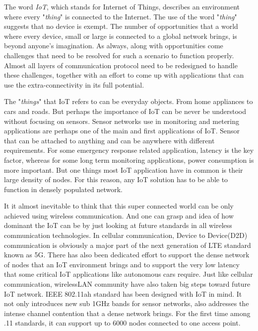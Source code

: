 \label{chapter:introduction}

The word \textit{IoT}, which stands for Internet of Things, describes an environment where every "\textit{thing}" is connected to the Internet. The use of the word "\textit{thing}" suggests that no device is exempt. The number of opportunities that a world where every device, small or large is connected to a global network brings, is beyond anyone's imagination. As always, along with opportunities come challenges that need to be resolved for such a scenario to function properly. Almost all layers of communication protocol need to be redesigned to handle these challenges, together with an effort to come up with applications that can use the extra-connectivity in its full potential.

The "\textit{things}" that IoT refers to can be everyday objects. From home appliances to cars and roads. But perhaps the importance of IoT can be never be understood without focusing on sensors. Sensor networks use in monitoring and metering applications are perhaps one of the main and first applications of IoT. Sensor that can be attached to anything and can be anywhere with different requirements. For some emergency response related application, latency is the key factor, whereas for some long term monitoring applications, power consumption is more important. But one things most IoT application have in common is their large density of nodes. For this reason, any IoT solution has to be able to function in densely populated network. 

It it almost inevitable to think that this super connected world can be only achieved using wireless communication. And one can grasp and idea of how dominant the IoT can be by just looking at future standards in all wireless communication technologies. In cellular communication, Device to Device(D2D) communication is obviously a major part of the next generation of LTE standard known as 5G\cite{doppler2009device}. There has also been dedicated effort to support the dense network of nodes that an IoT environment brings and to support the very low latency that some critical IoT applications like autonomous cars require. Just like cellular communication, wirelessLAN community have also taken big steps toward future IoT network. IEEE 802.11ah standard has been designed with IoT in mind. It not only introduces new sub 1GHz bands for sensor networks, also addresses the intense channel contention that a dense network brings. For the first time among .11 standards, it can support up to 6000 nodes connected to one access point\cite{khorov2015survey}. 

